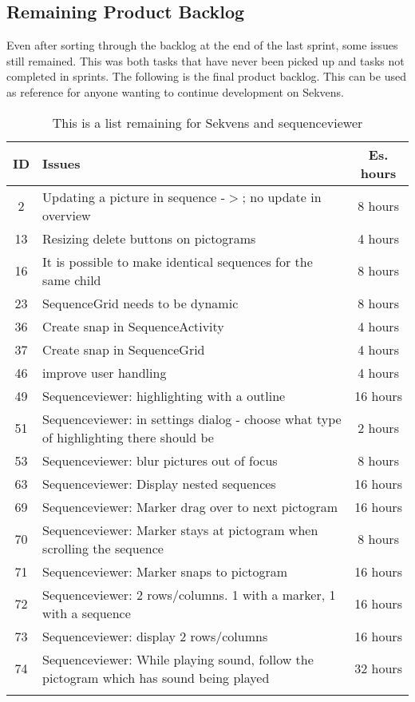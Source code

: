 \subsection{Remaining Product Backlog}
Even after sorting through the backlog at the end of the last sprint, some issues still remained. This was both tasks that have never been picked up and tasks not completed in sprints. The following is the final product backlog. This can be used as reference for anyone wanting to continue development on Sekvens.

\begin{longtable} { | c | p{12cm} | c | } 
\hline
	ID 	&	Issues	&	 Es. hours \\\hline
	2	& 	Updating a picture in sequence -$>$; no update in overview	& 	8 hours  \\\hline
	13	& 	Resizing delete buttons on pictograms	& 	4 hours  \\\hline
	16	& 	It is possible to make identical sequences for the same child	& 	8 hours  \\\hline
	23	& 	SequenceGrid needs to be dynamic	& 	8 hours  \\\hline
	36	& 	Create snap in SequenceActivity	& 	4 hours  \\\hline
	37	& 	Create snap in SequenceGrid	& 	4 hours  \\\hline
	46	& 	improve user handling 	& 	4 hours  \\\hline
	49	& 	Sequenceviewer: highlighting with a outline 	& 	16 hours  \\\hline
	51	& 	Sequenceviewer: in settings dialog - choose what type of highlighting there should be	& 	2 hours  \\\hline
	53	& 	Sequenceviewer: blur pictures out of focus	& 	8 hours  \\\hline
	63	& 	Sequenceviewer: Display nested sequences 	& 	16 hours  \\\hline
	69	& 	Sequenceviewer: Marker drag over to next pictogram 	& 	16 hours  \\\hline
	70	& 	Sequenceviewer: Marker stays at pictogram when scrolling the sequence 	& 	8 hours  \\\hline
	71	& 	Sequenceviewer: Marker snaps to pictogram 	& 	16 hours  \\\hline
	72	& 	Sequenceviewer: 2 rows/columns. 1 with a marker, 1 with a sequence 	& 	16 hours  \\\hline
	73	& 	Sequenceviewer: display 2 rows/columns 	& 	16 hours  \\\hline
	74	& 	Sequenceviewer: While playing sound, follow the pictogram which has sound being played 	& 	32 hours  \\\hline
\caption{This is a list remaining for Sekvens and sequenceviewer}
\label{tab:spr4_sw_prodblog}
\end{longtable}



